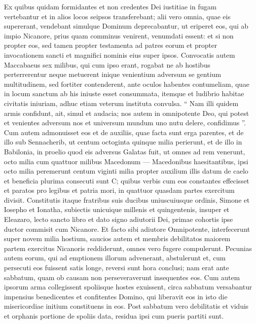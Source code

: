 \begin{biblechapter}
\begin{biblechapter}
\begin{biblechapter}
\begin{biblechapter}
\begin{biblechapter}
\begin{biblechapter}
\begin{biblechapter}
\begin{biblechapter}
\verse Ex quibus quidam formidantes et non credentes Dei iustitiae in fugam vertebantur et in alios locos seipsos transferebant; 
\verse alii vero omnia, quae eis supererant, vendebant simulque Dominum deprecabantur, ut eriperet eos, qui ab impio Nicanore, prius quam comminus venirent, venumdati essent: 
\verse et si non propter eos, sed tamen propter testamenta ad patres eorum et propter invocationem sancti et magnifici nominis eius super ipsos. 
\verse Convocatis autem Maccabaeus sex milibus, qui cum ipso erant, rogabat ne ab hostibus perterrerentur neque metuerent inique venientium adversum se gentium multitudinem, sed fortiter contenderent, 
\verse ante oculos habentes contumeliam, quae in locum sanctum ab his iniuste esset consummata, itemque et ludibrio habitae civitatis iniuriam, adhuc etiam veterum instituta convulsa. 
 \verse “ Nam illi quidem armis confidunt, ait, simul et audacia; nos autem in omnipotente Deo, qui potest et venientes adversum nos et universum mundum uno nutu delere, confidimus ”. 
\verse Cum autem admonuisset eos et de auxiliis, quae facta sunt erga parentes, et de illo sub Sennacherib, ut centum octoginta quinque milia perierunt, 
\verse et de illo in Babilonia, in proelio quod eis adversus Galatas fuit, ut omnes ad rem venerunt, octo milia cum quattuor milibus Macedonum — Macedonibus haesitantibus, ipsi octo milia peremerunt centum viginti milia propter auxilium illis datum de caelo et beneficia plurima consecuti sunt C; 
\verse quibus verbis cum eos constantes effecisset et paratos pro legibus et patria mori, in quattuor quasdam partes exercitum divisit. 
\verse Constitutis itaque fratribus suis ducibus uniuscuiusque ordinis, Simone et Iosepho et Ionatha, subiectis unicuique millenis et quingentenis, 
\verse insuper et Eleazaro, lecto sancto libro et dato signo adiutorii Dei, primae cohortis ipse ductor commisit cum Nicanore. 
\verse Et facto sibi adiutore Omnipotente, interfecerunt super novem milia hostium, saucios autem et membris debilitatos maiorem partem exercitus Nicanoris reddiderunt, omnes vero fugere compulerunt. 
 \verse Pecunias autem eorum, qui ad emptionem illorum advenerant, abstulerunt et, cum persecuti eos fuissent satis longe, reversi sunt hora conclusi; 
\verse nam erat ante sabbatum, quam ob causam non perseveraverunt insequentes eos. 
\verse Cum autem ipsorum arma collegissent spoliisque hostes exuissent, circa sabbatum versabantur impensius benedicentes et confitentes Domino, qui liberavit eos in isto die misericordiae initium constituens in eos. 
\verse Post sabbatum vero debilitatis et viduis et orphanis portione de spoliis data, residua ipsi cum pueris partiti sunt. 

\end{biblechapter}
\end{biblechapter}
\end{biblechapter}
\end{biblechapter}
\end{biblechapter}
\end{biblechapter}
\end{biblechapter}
\end{biblechapter}
